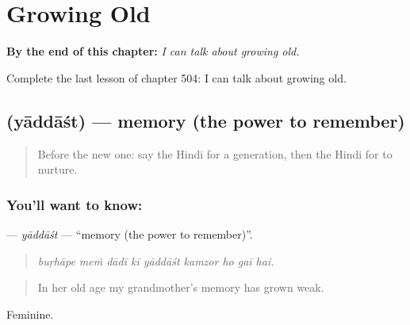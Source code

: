 
\chapter{Growing Old}
\label{ch:hi-growing-old}

\begin{chapteropening}
\textbf{By the end of this chapter:} \emph{I can talk about growing old.}

Complete the last lesson of chapter 504: I can talk about growing old.
\end{chapteropening}

\section[\texorpdfstring{\hi{याददाश्त} (yāddāśt)}{याददाश्त (yāddāśt)}]{ (yāddāśt) — memory (the power to remember)}

\label{lesson:HI-C504-yaddast}



\begin{quote}
Before the new one: say the Hindi for a generation, then the Hindi for to nurture.
\end{quote}

\subsection*{You'll want to know: }
\textbf{} — \emph{yāddāśt} — \textquotedblleft{}memory (the power to remember)\textquotedblright{}.

\begin{quote}
        
\end{quote}

\begin{quote}
\emph{buṛhāpe meṁ dādī kī yāddāśt kamzor ho gaī hai.}
\end{quote}

\begin{quote}
In her old age my grandmother's memory has grown weak.
\end{quote}

Feminine.


